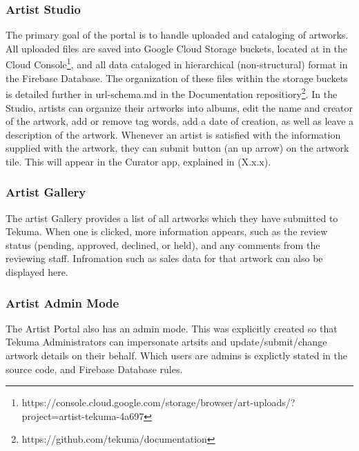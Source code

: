 \documentclass[fontsize=12pt]{scrartcl} %
\numberwithin{equation}{section} %
\numberwithin{figure}{section} %
\numberwithin{table}{section} %
\begin{document}
\subsubsection{Artist Studio}
The primary goal of the portal is to handle uploaded and cataloging of artworks. All uploaded files are saved into Google Cloud Storage buckets, located at in the Cloud Console\footnote{https://console.cloud.google.com/storage/browser/art-uploads/?project=artist-tekuma-4a697}, and all data cataloged in hierarchical (non-structural) format in the Firebase Database. The organization of these files within the storage buckets is detailed further in url-schema.md in the Documentation repositiory\footnote{ https://github.com/tekuma/documentation}. In the Studio, artists can organize their artworks into albums, edit the name and creator of the artwork, add or remove tag words, add a date of creation, as well as leave a description of the artwork. Whenever an artist is satisfied with the information supplied with the artwork, they can submit button (an up arrow) on the artwork tile. This will appear in the Curator app, explained in (X.x.x).

\subsubsection{Artist Gallery}
The artist Gallery provides a list of all artworks which they have submitted to Tekuma. When one is clicked, more information appears, such as the review status (pending, approved, declined, or held), and any comments from the reviewing staff. Infromation such as sales data for that artwork can also be displayed here.

\subsubsection{Artist Admin Mode}
The Artist Portal also has an admin mode. This was explicitly created so that Tekuma Administrators can impersonate artsits and update/submit/change artwork details on their behalf. Which users are admins is explictly stated in the source code, and Firebase Database rules.
\end{document}
